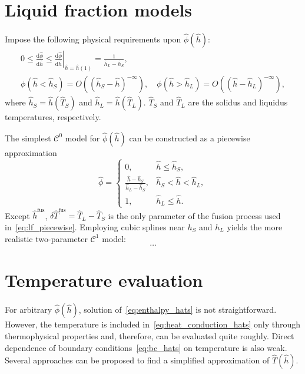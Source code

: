 \documentclass{article}
\newcommand{\dd}{\mathrm{d}}
\newcommand{\der}[2][]{\frac{\dd#1}{\dd#2}}
\newcommand{\OO}[1]{O(#1)}
\newcommand{\fusion}[1]{{#1}^\mathrm{fus}}
\begin{document}

\section{Liquid fraction models}

Impose the following physical requirements upon \(\hat\phi(\hat{h})\):
\begin{gather}
    0 \leq \der[\hat\phi]{\hat{h}} \leq \left.\der[\hat\phi]{\hat{h}}\right|_{\hat{h}=\hat{h}(1)} =
        \frac1{\hat{h}_L-\hat{h}_S}, \label{eq:lf_monotonic}\\
	\phi(\hat{h}<\hat{h}_S) = \OO{(\hat{h}_S-\hat{h})^{-\infty}}, \quad
	    \phi(\hat{h}>\hat{h}_L) = \OO{(\hat{h}-\hat{h}_L)^{-\infty}}, \label{eq:lf_exp_decay}
\end{gather}
where \(\hat{h}_S = \hat{h}(\hat{T}_S)\) and \(\hat{h}_L = \hat{h}(\hat{T}_L)\).
\(\hat{T}_S\) and \(\hat{T}_L\) are the solidus and liquidus temperatures, respectively.

The simplest \(\mathcal{C}^0\) model for \(\hat{\phi}(\hat{h})\) can be constructed as a piecewise approximation
\begin{equation}\label{eq:lf_piecewise}
	\hat{\phi} = \begin{cases}
        0,                                             & \hat{h} \leq \hat{h}_S, \\
        \frac{\hat{h}-\hat{h}_S}{\hat{h}_L-\hat{h}_S}, & \hat{h}_S < \hat{h} < \hat{h}_L, \\
        1,                                             & \hat{h}_L \leq \hat{h}.
    \end{cases}
\end{equation}
Except \(\fusion{\hat{h}}\), \(\delta\fusion{\hat{T}} = \hat{T}_L - \hat{T}_S\)
is the only parameter of the fusion process  used in~\eqref{eq:lf_piecewise}.
Employing cubic splines near \(h_S\) and \(h_L\) yields the more realistic two-parameter \(\mathcal{C}^1\) model:
\begin{equation}\label{eq:lf_splines}
	\dots
\end{equation}

\section{Temperature evaluation}

For arbitrary \(\hat{\phi}(\hat{h})\), solution of~\eqref{eq:enthalpy_hats} is not straightforward.
However, the temperature is included in~\eqref{eq:heat_conduction_hats} only through thermophysical properties
and, therefore, can be evaluated quite roughly.
Direct dependence of boundary conditions~\eqref{eq:bc_hats} on temperature is also weak.
Several approaches can be proposed to find a simplified approximation of \(\hat{T}(\hat{h})\).
\end{document}
